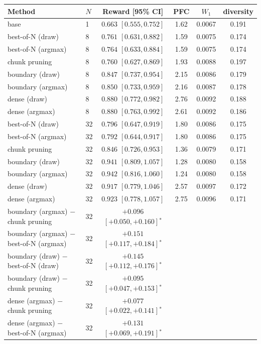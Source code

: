 \begin{tabular}{llcccc}
\toprule
Method & $N$ & Reward [95\% CI] & PFC & $W_1$ & diversity \\
\midrule
base & 1 & $0.663$ $[0.555, 0.752]$ & 1.62 & 0.0067 & 0.191 \\
best-of-N (draw) & 8 & $0.761$ $[0.631, 0.882]$ & 1.59 & 0.0075 & 0.174 \\
best-of-N (argmax) & 8 & $0.764$ $[0.633, 0.884]$ & 1.59 & 0.0075 & 0.174 \\
chunk pruning & 8 & $0.760$ $[0.627, 0.869]$ & 1.93 & 0.0088 & 0.197 \\
boundary (draw) & 8 & $0.847$ $[0.737, 0.954]$ & 2.15 & 0.0086 & 0.179 \\
boundary (argmax) & 8 & $0.850$ $[0.733, 0.959]$ & 2.16 & 0.0087 & 0.178 \\
dense (draw) & 8 & $0.880$ $[0.772, 0.982]$ & 2.76 & 0.0092 & 0.188 \\
dense (argmax) & 8 & $0.880$ $[0.763, 0.992]$ & 2.61 & 0.0092 & 0.186 \\
best-of-N (draw) & 32 & $0.796$ $[0.647, 0.919]$ & 1.80 & 0.0086 & 0.175 \\
best-of-N (argmax) & 32 & $0.792$ $[0.644, 0.917]$ & 1.80 & 0.0086 & 0.175 \\
chunk pruning & 32 & $0.846$ $[0.726, 0.953]$ & 1.36 & 0.0079 & 0.171 \\
boundary (draw) & 32 & $0.941$ $[0.809, 1.057]$ & 1.28 & 0.0080 & 0.158 \\
boundary (argmax) & 32 & $0.942$ $[0.816, 1.060]$ & 1.24 & 0.0080 & 0.158 \\
dense (draw) & 32 & $0.917$ $[0.779, 1.046]$ & 2.57 & 0.0097 & 0.172 \\
dense (argmax) & 32 & $0.923$ $[0.778, 1.057]$ & 2.75 & 0.0096 & 0.171 \\
\midrule
boundary (argmax) $-$ chunk pruning & 32 & $+0.096$ $[+0.050, +0.160]$$^*$ & & & \\
boundary (argmax) $-$ best-of-N (argmax) & 32 & $+0.151$ $[+0.117, +0.184]$$^*$ & & & \\
boundary (draw) $-$ best-of-N (draw) & 32 & $+0.145$ $[+0.112, +0.176]$$^*$ & & & \\
boundary (draw) $-$ chunk pruning & 32 & $+0.095$ $[+0.047, +0.153]$$^*$ & & & \\
dense (argmax) $-$ chunk pruning & 32 & $+0.077$ $[+0.022, +0.141]$$^*$ & & & \\
dense (argmax) $-$ best-of-N (argmax) & 32 & $+0.131$ $[+0.069, +0.191]$$^*$ & & & \\

\end{tabular}
